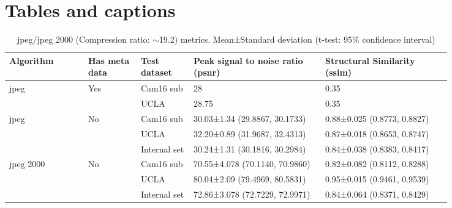 \documentclass[review]{elsarticle}
\begin{document}


\nocite{*}





\section{Tables and captions}
\begin{table}[]
    \centering
    \begin{tabular}{p{0.15\linewidth} p{0.1\linewidth} p{0.1\linewidth} p{0.25\linewidth} p{0.24\linewidth}}
    \toprule
    \textbf{Algorithm} & \textbf{Has meta data} & \textbf{Test dataset} & \textbf{Peak signal to noise ratio (\gls{psnr})} & \textbf{Structural Similarity (\gls{ssim})} \\
    \bottomrule
    jpeg & Yes & Cam16 sub & 28 & 0.35 \\
    & & UCLA & 28.75 & 0.35 \\
    \bottomrule
    
    jpeg & No & Cam16 sub & 30.03±1.34 (29.8867, 30.1733) & 0.88±0.025 (0.8773, 0.8827) \\
    & & UCLA & 32.20±0.89 (31.9687, 32.4313) & 0.87±0.018 (0.8653, 0.8747) \\
    & & Internal set & 30.24±1.31 (30.1816, 30.2984) & 0.84±0.038 (0.8383, 0.8417) \\
    \bottomrule
    
    jpeg 2000 & No & Cam16 sub & 70.55±4.078 (70.1140, 70.9860) & 0.82±0.082 (0.8112, 0.8288) \\
    & & UCLA & 80.04±2.09 (79.4969, 80.5831) & 0.95±0.015 (0.9461, 0.9539) \\
    & & Internal set & 72.86±3.078 (72.7229, 72.9971) & 0.84±0.064 (0.8371, 0.8429) \\
    \bottomrule
    \end{tabular}
    \caption{jpeg/jpeg 2000 (Compression ratio: $\sim$19.2) metrics. Mean±Standard deviation (t-test: 95\% confidence interval)}
    \label{tab:my_label}
\end{table}
\end{document}
